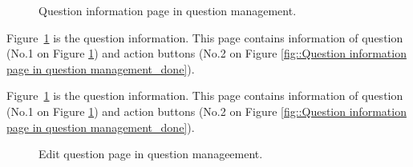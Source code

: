 \documentclass[12pt,oneside,openright,a4paper]{cpe-english-project}
\begin{document}
	\begin{figure}[!h]\centering
		\caption{Question information page in question management.}\label{fig:Question information page in question management_done}
	\end{figure}
	\begin{flushleft}
		Figure~\ref*{fig:Question information page in question management_done} is the question information. This page contains information of question (No.1 on Figure \ref*{fig:Question information page in question management_done}) and action buttons (No.2 on Figure \ref*{fig::Question information page in question management_done}).
	\end{flushleft}
	\begin{flushleft}
		Figure~\ref*{fig:Question information page in question management_done} is the question information. This page contains information of question (No.1 on Figure \ref*{fig:Question information page in question management_done}) and action buttons (No.2 on Figure \ref*{fig::Question information page in question management_done}).
	\end{flushleft}

	\begin{figure}[!h]\centering
		\caption{Edit question page in question manageement.}\label{fig:Edit question page in question manageement_done}
	\end{figure}
\end{document}
